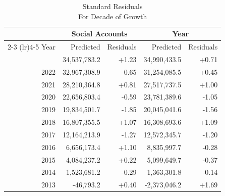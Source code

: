 \begin{table}[!t]
\caption*{
{\large Standard Residuals} \\
{\small For Decade of Growth}
} 

\fontsize{12.0pt}{14.4pt}\selectfont

\begin{tabular*}{\linewidth}{@{\extracolsep{\fill}}rrrrr}
\toprule
 & \multicolumn{2}{c}{Social Accounts} & \multicolumn{2}{c}{Year} \\ 
\cmidrule(lr){2-3} \cmidrule(lr){4-5}
Year & Predicted & Residuals & Predicted & Residuals \\ 
\midrule\addlinespace[2.5pt]
2023 & 34,537,783.2 & +1.23 & 34,990,433.5 & +0.71 \\
2022 & 32,967,308.9 & -0.65 & 31,254,085.5 & +0.45 \\
2021 & 28,210,364.8 & +0.81 & 27,517,737.5 & +1.00 \\
2020 & 22,656,803.4 & -0.59 & 23,781,389.6 & -1.05 \\
2019 & 19,834,501.7 & -1.85 & 20,045,041.6 & -1.56 \\
2018 & 16,807,355.5 & +1.07 & 16,308,693.6 & +1.09 \\
2017 & 12,164,213.9 & -1.27 & 12,572,345.7 & -1.20 \\
2016 & 6,656,173.4 & +1.10 & 8,835,997.7 & -0.28 \\
2015 & 4,084,237.2 & +0.22 & 5,099,649.7 & -0.37 \\
2014 & 1,523,681.2 & -0.29 & 1,363,301.8 & -0.14 \\
2013 & -46,793.2 & +0.40 & -2,373,046.2 & +1.69 \\
\bottomrule
\end{tabular*}

\end{table}
